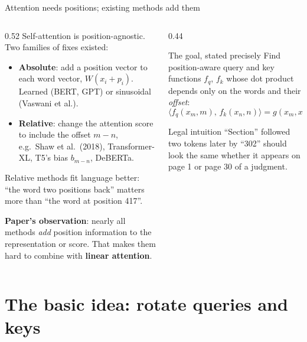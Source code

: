 \documentclass[aspectratio=169,11pt]{beamer}
\begin{document}
\begin{frame}{Attention needs positions; existing methods add them}
  \begin{columns}[T]
    \begin{column}{0.52\textwidth}
      \small
      Self-attention is position-agnostic. Two families of fixes existed:
      \begin{itemize}
        \item \textbf{Absolute}: add a position vector to each word vector, $W(x_i+p_i)$. Learned (BERT, GPT) or sinusoidal (Vaswani et al.).
        \item \textbf{Relative}: change the attention score to include the offset $m-n$, e.g.\ Shaw et al.\ (2018), Transformer-XL, T5's bias $b_{m-n}$, DeBERTa.
      \end{itemize}
      Relative methods fit language better: ``the word two positions back'' matters more than ``the word at position 417''.
      \vspace{1mm}

      \textbf{Paper's observation}: nearly all methods \emph{add} position information to the representation or score. That makes them hard to combine with \textbf{linear attention}.
    \end{column}
    \begin{column}{0.44\textwidth}
      \begin{exampleblock}{The goal, stated precisely}
        \small
        Find position-aware query and key functions $f_q$, $f_k$ whose dot product depends only on the words and their \emph{offset}:
        \[
          \langle f_q(x_m,m),\,f_k(x_n,n)\rangle=g(x_m,x_n,m-n)
        \]
      \end{exampleblock}
      \begin{exampleblock}{Legal intuition}
        \small
        ``Section'' followed two tokens later by ``302'' should look the same whether it appears on page 1 or page 30 of a judgment.
      \end{exampleblock}
    \end{column}
  \end{columns}
\end{frame}

\section{The basic idea: rotate queries and keys}
\end{document}
